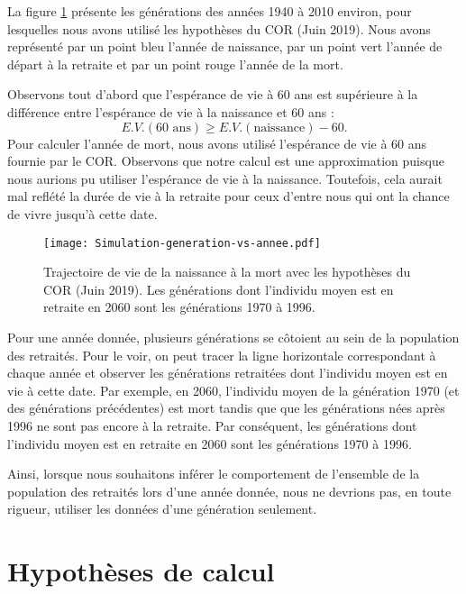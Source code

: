 \documentclass[10pt]{article}
\begin{document}
La figure \ref{fig-trajectoire-vie} présente les générations des années 1940 
à 2010 environ, pour lesquelles nous avons utilisé les hypothèses du COR (Juin 2019).
Nous avons représenté par un point bleu l'année de naissance, par un point 
vert l'année de départ à la retraite et par un point rouge l'année de la 
mort. 

Observons tout d'abord que l'espérance de vie à 60 ans est supérieure à la 
différence entre l'espérance de vie à la naissance et 60 ans :
$$
E.V.(\textrm{60 ans}) \geq E.V.(\textrm{naissance}) - 60.
$$
Pour calculer l'année de mort, nous avons utilisé l'espérance de vie à 60 ans 
fournie par le COR. 
Observons que notre calcul est une approximation puisque nous aurions pu utiliser 
l'espérance de vie à la naissance. 
Toutefois, cela aurait mal reflété la durée de vie à la retraite pour ceux 
d'entre nous qui ont la chance de vivre jusqu'à cette date. 

\begin{figure}
\begin{center}
\texttt{[image: Simulation-generation-vs-annee.pdf]}
\end{center}
\caption{Trajectoire de vie de la naissance à la mort avec 
les hypothèses du COR (Juin 2019). 
Les générations dont l'individu moyen est en retraite en 2060 
sont les générations 1970 à 1996. }
\label{fig-trajectoire-vie}
\end{figure}

Pour une année donnée, plusieurs générations se côtoient au sein de la population des retraités. 
Pour le voir, on peut tracer la ligne horizontale correspondant à chaque année et observer les générations retraitées dont l'individu moyen est en vie à cette date. 
Par exemple, en 2060, l'individu moyen de la génération 1970 (et des générations précédentes) est mort tandis que que les générations nées après 1996 ne sont pas encore à la retraite. 
Par conséquent, les générations dont l'individu moyen est en retraite en 2060 sont les générations 1970 à 1996. 

Ainsi, lorsque nous souhaitons inférer le comportement de l'ensemble de la 
population des retraités lors d'une année donnée, nous ne devrions pas, en toute 
rigueur, utiliser les données d'une génération seulement. 


\section{Hypothèses de calcul}
\end{document}
